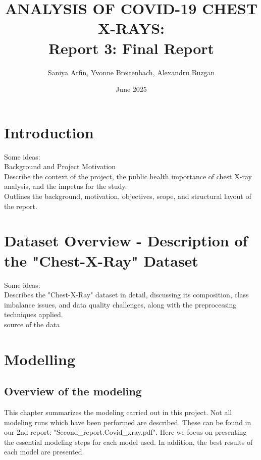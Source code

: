 \documentclass{article}
\title{ANALYSIS OF COVID-19 CHEST X-RAYS: \\Report 3: Final Report}
\author{Saniya Arfin, Yvonne Breitenbach, Alexandru Buzgan}
\date{June 2025}
\begin{document}
\maketitle

\tableofcontents

\newpage 

\section{Introduction}
Some ideas: \\
Background and Project Motivation\\
Describe the context of the project, the public health importance of chest X-ray analysis, and the impetus for the study.\\
Outlines the background, motivation, objectives, scope, and structural layout of the report.\\



\section{Dataset Overview - Description of the "Chest-X-Ray" Dataset}
Some ideas: \\
Describes the "Chest-X-Ray" dataset in detail, discussing its composition, class imbalance issues, and data quality challenges, along with the preprocessing techniques applied.\\
source of the data\\


\section{Modelling} \label{section:modelling}


\subsection{Overview of the modeling}
This chapter summarizes the modeling carried out in this project. Not all modeling runs which have been performed are described. These can be found in our 2nd report: "Second\_report.Covid\_xray.pdf". Here we focus on presenting the essential modeling steps for each model used. In addition, the best results of each model are presented. 
\end{document}
